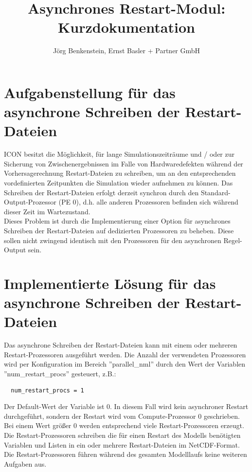 \documentclass[a4paper,10pt,DIV14]{scrartcl}
\title{Asynchrones Restart-Modul: Kurzdokumentation}
\author{J\"org Benkenstein, Ernst Basler + Partner GmbH}
\begin{document}
\maketitle

\section{Aufgabenstellung f\"ur das asynchrone Schreiben der Restart-Dateien}

ICON besitzt die M\"oglichkeit, f\"ur lange Simulationszeitr\"aume und / oder zur Sicherung von Zwischenergebnissen 
im Falle von Hardwaredefekten w\"ahrend der Vorhersagerechnung Restart-Dateien zu schreiben, um an den entsprechenden 
vordefinierten Zeitpunkten die Simulation wieder aufnehmen zu k\"onnen.
Das Schreiben der Restart-Dateien erfolgt derzeit synchron durch den Standard-Output-Prozessor (PE 0), d.h. alle 
anderen Prozessoren befinden sich w\"ahrend dieser Zeit im Wartezustand.\\

Dieses Problem ist durch die Implementierung einer Option f\"ur asynchrones Schreiben der Restart-Dateien auf
dedizierten Prozessoren zu beheben. Diese sollen nicht zwingend identisch mit den Prozessoren f\"ur den asynchronen
Regel-Output sein.


\section{Implementierte L\"osung f\"ur das asynchrone Schreiben der Restart-Dateien}

Das asynchrone Schreiben der Restart-Dateien kann mit einem oder mehreren Restart-Prozessoren ausgef\"uhrt werden.
Die Anzahl der verwendeten Prozessoren wird per Konfiguration im Bereich ''parallel\_nml'' durch den Wert der Variablen
''num\_restart\_procs'' gesteuert, z.B.:
\begin{verbatim}
  num_restart_procs = 1 
\end{verbatim}
Der Default-Wert der Variable ist 0.
In diesem Fall wird kein asynchroner Restart durchgef\"uhrt, sondern der Restart wird vom Compute-Prozessor 0 geschrieben.
Bei einem Wert gr\"o\ss er 0 werden entsprechend viele Restart-Prozessoren erzeugt.
Die Restart-Prozessoren schreiben die f\"ur einen Restart des Modells ben\"otigten Variablen und Listen in ein oder mehrere
Restart-Dateien im NetCDF-Format.
Die Restart-Prozessoren f\"uhren w\"ahrend des gesamten Modelllaufs keine weiteren Aufgaben aus.\\
\end{document}
